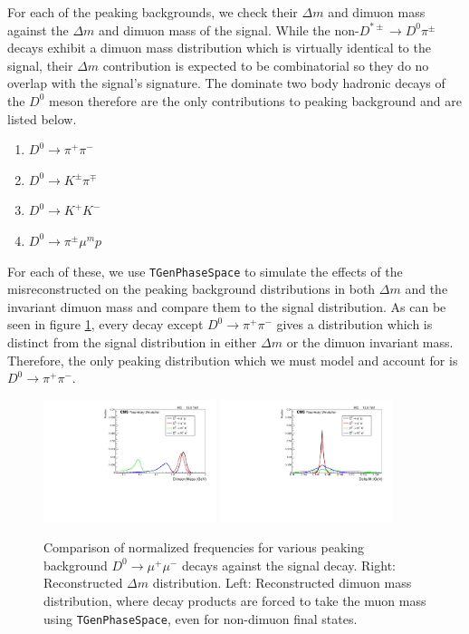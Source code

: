 For each of the peaking backgrounds, we check their $\Delta m$ and dimuon mass against the $\Delta m$ and dimuon mass of the signal. While the non-$D^{*\pm} \to D^0 \pi^\pm$ decays exhibit a dimuon mass distribution which is virtually identical to the signal, their $\Delta m$ contribution is expected to be combinatorial so they do no overlap with the signal's signature. The dominate two body hadronic decays of the $D^0$ meson therefore are the only contributions to peaking background and are listed below.
\begin{enumerate}
    \item $D^0 \to \pi^+ \pi^-$
    \item $D^0 \to K^\pm \pi^\mp$
    \item $D^0 \to K^+ K^-$
    \item $D^0 \to \pi^\pm \mu^mp$
\end{enumerate}
For each of these, we use \texttt{TGenPhaseSpace} to simulate the effects of the misreconstructed on the peaking background distributions in both $\Delta m$ and the invariant dimuon mass and compare them to the signal distribution. As can be seen in figure \ref{fig:reconstructed_D0_comparison}, every decay except $D^0 \to \pi^+ \pi^-$ gives a distribution which is distinct from the signal distribution in either $\Delta m$ or the dimuon invariant mass. Therefore, the only peaking distribution which we must model and account for is $D^0 \to \pi^+ \pi^-$. 

\begin{figure}[htp]
    \begin{center}
      \includegraphics[width=0.45\textwidth]{figures/chapter4/reconstructed_D0_mass.pdf}
      \includegraphics[width=0.45\textwidth]{figures/chapter4/reconstructed_delta_m.pdf}\\
    \end{center}
    \caption{
      Comparison of normalized frequencies for various peaking background $D^0 \to \mu^+ \mu^-$ decays against the signal decay.
      Right: Reconstructed $\Delta m$ distribution.
      Left: Reconstructed dimuon mass distribution, where decay products are forced to take the muon mass using \texttt{TGenPhaseSpace}, even for non-dimuon final states.
    }
    \label{fig:reconstructed_D0_comparison}
  \end{figure}
  
